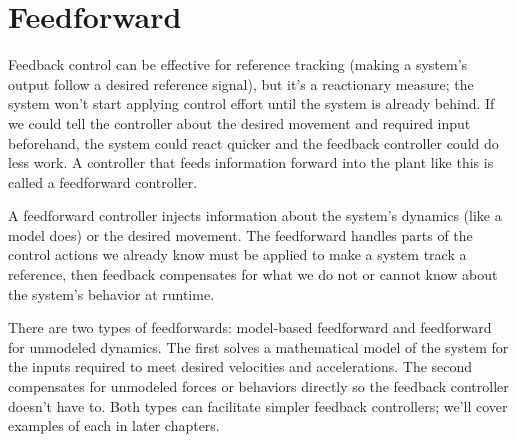 \section{Feedforward}

Feedback control can be effective for \gls{reference} \gls{tracking} (making a
\gls{system}'s output follow a desired \gls{reference} signal), but it's a
reactionary measure; the \gls{system} won't start applying \gls{control effort}
until the \gls{system} is already behind. If we could tell the \gls{controller}
about the desired movement and required input beforehand, the \gls{system} could
react quicker and the feedback \gls{controller} could do less work. A
\gls{controller} that feeds information forward into the \gls{plant} like this
is called a \gls{feedforward controller}.

A \gls{feedforward controller} injects information about the \gls{system}'s
dynamics (like a \gls{model} does) or the desired movement. The feedforward
handles parts of the control actions we already know must be applied to make a
\gls{system} track a \gls{reference}, then feedback compensates for what we do
not or cannot know about the \gls{system}'s behavior at runtime.

There are two types of feedforwards: model-based feedforward and feedforward for
unmodeled dynamics. The first solves a mathematical model of the system for the
inputs required to meet desired velocities and accelerations. The second
compensates for unmodeled forces or behaviors directly so the feedback
controller doesn't have to. Both types can facilitate simpler feedback
controllers; we'll cover examples of each in later chapters.

